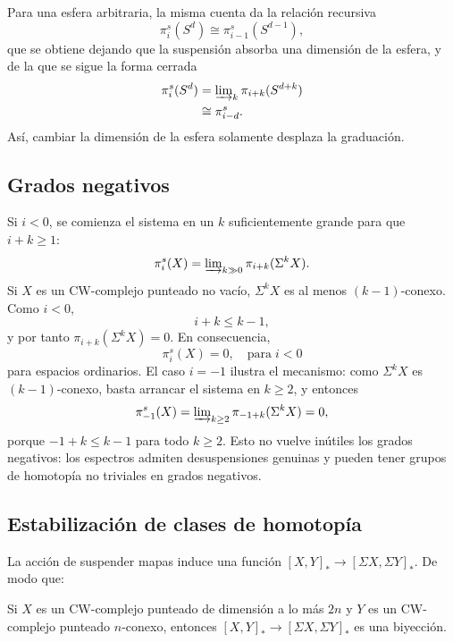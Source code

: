 Para una esfera arbitraria, la misma cuenta da la relación recursiva
\[
\pi_i^s(S^d)\cong\pi_{i-1}^s(S^{d-1}),
\]
que se obtiene dejando que la suspensión absorba una dimensión de la esfera, y de la que se sigue la forma cerrada
\[
\begin{aligned}
\pi_i^s(S^d)
&=\varinjlim\nolimits_k\pi_{i+k}(S^{d+k})\\
&\cong\pi_{i-d}^s.
\end{aligned}
\]
Así, cambiar la dimensión de la esfera solamente desplaza la graduación.

\subsection{Grados negativos}

Si \(i<0\), se comienza el sistema en un \(k\) suficientemente grande para que \(i+k\ge1\):
\[
\pi_i^s(X)=\varinjlim\nolimits_{k\gg0}\pi_{i+k}(\Sigma^kX).
\]
Si \(X\) es un CW-complejo punteado no vacío, \(\Sigma^kX\) es al menos \((k-1)\)-conexo. Como \(i<0\),
\[
i+k\le k-1,
\]
y por tanto \(\pi_{i+k}(\Sigma^kX)=0\). En consecuencia,
\[
\pi_i^s(X)=0,
\quad\text{para}\;i<0
\]
para espacios ordinarios.
El caso \(i=-1\) ilustra el mecanismo: como \(\Sigma^kX\) es \((k-1)\)-conexo, basta arrancar el sistema en \(k\ge2\), y entonces
\[
\pi_{-1}^s(X)=\varinjlim\nolimits_{k\ge2}\pi_{-1+k}(\Sigma^kX)=0,
\]
porque \(-1+k\le k-1\) para todo \(k\ge2\).
Esto no vuelve inútiles los grados negativos: los espectros admiten desuspensiones genuinas y pueden tener grupos de homotopía no triviales en grados negativos.

\subsection{Estabilización de clases de homotopía}

La acción de suspender mapas induce una función $[X,Y]_* \to [\Sigma X, \Sigma Y]_*$. De modo que:

\begin{prop}\label{prop:biysus}
Si $X$ es un CW-complejo punteado de dimensión a lo más $2n$ y $Y$ es un CW-complejo punteado $n$-conexo, entonces $[X,Y]_* \to [\Sigma X, \Sigma Y]_*$ es una biyección.
\end{prop}

